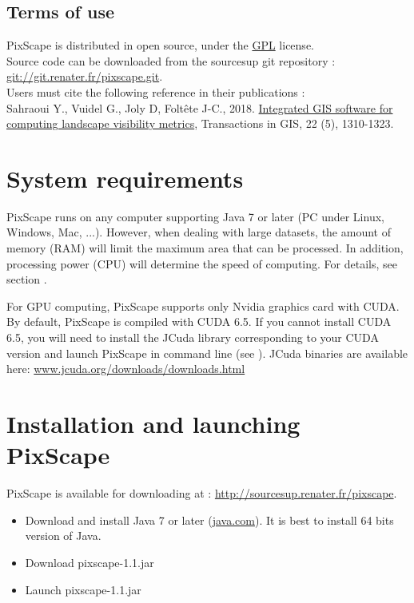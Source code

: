 \documentclass{report}
\begin{document}
\subsection{Terms of use}
PixScape is distributed in open source, under the \href{https://www.gnu.org/licenses/gpl-3.0.html}{GPL} license.\\
Source code can be downloaded from the sourcesup git repository : \url{git://git.renater.fr/pixscape.git}.\\
Users must cite the following reference in their publications :\\
Sahraoui Y., Vuidel G., Joly D, Foltête J-C., 2018. \href{http://dx.doi.org/10.1111/tgis.12457}{Integrated GIS software for computing landscape visibility metrics}, Transactions in GIS, 22 (5), 1310-1323. 


\section{System requirements}

PixScape runs on any computer supporting Java 7 or later (PC under Linux, Windows, Mac, ...). 
However, when dealing with large datasets, the amount of memory (RAM) will limit the maximum area that can be processed. In addition, processing power (CPU) will determine the speed of computing. For details, see section .

For GPU computing, PixScape supports only Nvidia graphics card with CUDA. By default, PixScape is compiled with CUDA 6.5. If you cannot install CUDA 6.5, you will need to install the JCuda library corresponding to your CUDA version and launch PixScape in command line (see ). JCuda binaries are available here: \href{http://www.jcuda.org/downloads/downloads.html}{www.jcuda.org/downloads/downloads.html}

\section{Installation and launching PixScape}

PixScape is available for downloading at : \url{http://sourcesup.renater.fr/pixscape}.

\begin{itemize}
	\item Download and install Java 7 or later (\href{http://www.java.com}{java.com}). It is best to install 64 bits version of Java.
	\item Download pixscape-1.1.jar
	\item Launch pixscape-1.1.jar
\end{itemize}
\end{document}
